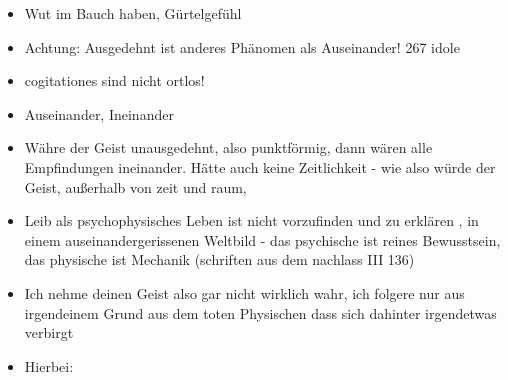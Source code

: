\documentclass[a4paper, 12pt]{article}
\begin{document}
\begin{onehalfspace}
\begin{itemize}
  \item Wut im Bauch haben, Gürtelgefühl
  \item Achtung: Ausgedehnt ist anderes Phänomen als Auseinander! 267 idole
  \item cogitationes sind nicht ortlos!
  \item Auseinander, Ineinander
  \item Währe der Geist unausgedehnt, also punktförmig, dann wären alle Empfindungen ineinander. Hätte auch keine Zeitlichkeit - wie also würde der Geist, außerhalb von zeit und raum, 
  \item Leib als psychophysisches Leben ist nicht vorzufinden und zu erklären , in einem auseinandergerissenen Weltbild - das psychische ist reines Bewusstsein, das physische ist Mechanik (schriften aus dem nachlass III 136)
  \item Ich nehme deinen Geist also gar nicht wirklich wahr, ich folgere nur aus irgendeinem Grund aus dem toten Physischen dass sich dahinter irgendetwas verbirgt
  \item Hierbei: 
\end{itemize}





\end{onehalfspace}
\end{document}

